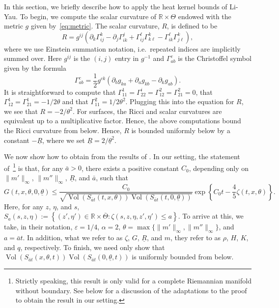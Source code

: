 \documentclass[11pt]{article}    %
\newcommand{\R}{\mathbb{R}}
\renewcommand{\epsilon}{\varepsilon}
\DeclareMathOperator{\Vol}{Vol}
\begin{document}
In this section, we briefly describe how to apply the heat kernel bounds of Li-Yau.  To begin, we compute the scalar curvature of $\R\times \Theta$ endowed with the metric $g$ given by~\eqref{eq:metric}.  The scalar curvature, $R$, is defined to be
\[
	R = g^{ij} \left( \partial_k \Gamma_{ij}^k - \partial_j \Gamma_{ik}^j + \Gamma_{ij}^\ell\Gamma_{k\ell}^k - \Gamma_{ik}^\ell\Gamma_{j\ell}^k\right),
\]
where we use Einstein summation notation, i.e.~repeated indices are implicitly summed over.  Here $g^{ij}$ is the $(i,j)$ entry in $g^{-1}$ and $\Gamma_{ab}^c$ is the Christoffel symbol given by the formula
\[
	\Gamma_{ab}^c = \frac{1}{2} g^{ck} \left( \partial_b g_{ka} + \partial_a g_{kb} - \partial_k g_{ab}\right).
\]
It is straightforward to compute that $\Gamma_{11}^1 = \Gamma_{22}^i = \Gamma_{12}^2 = \Gamma_{21}^2 = 0$, that $\Gamma_{12}^1 = \Gamma_{21}^1 = - 1/2\theta$ and that $\Gamma_{11}^2 = 1/2\theta^2$.  Plugging this into the equation for $R$, we see that $R = -2/\theta^2$.  For surfaces, the Ricci and scalar curvatures are equivalent up to a multiplicative factor.  Hence, the above computations bound the Ricci curvature from below.
Hence, $R$ is bounded uniformly below by a constant $-\underline R$, where we set $\underline R = 2/\underline\theta^2$.

We now show how to obtain  from the results of \cite{LiYau}.  In our setting, the statement of~\cite[Corollary~3.2]{LiYau}\footnote{Strictly speaking, this result is only valid for a complete Riemannian manifold without boundary.  See below for a discussion of the adaptations to the proof to obtain the result in our setting.} %
is that, for any $\bar a >0$, %
there exists a positive constant $C_0$, depending only on $\|m'\|_\infty$, $\|m''\|_\infty$, $\underline R$, and $\bar a$, such that
\begin{equation}\label{eq:prelim_heat_kernel_bound}
	G(t,x,\theta, 0, \underline\theta)
		\leq \frac{C_0}{\sqrt{\Vol(S_{\bar a t}(t,x,\theta)) \Vol(S_{\bar a t}(t,0,\underline\theta))}} \exp \left\{ C_0t - \frac{4}{5} \zeta(t,x,\theta) \right\}.
\end{equation}
Here, for any $z$, $\eta$, and $s$, $S_{a}(s,z,\eta) := \left\{(z',\eta') \in \R\times \overline{\Theta} : \zeta(s,z,\eta,z',\eta') \leq a \right\}$.  To arrive at this, we take, in their notation, $\epsilon = 1/4$, $\alpha = 2$, $\theta = \max\{\|m'\|_\infty, \|m''\|_\infty\}$, and $a = \bar at$. %
 In addition, what we refer to as $\zeta$, $G$, $\underline R$, and $m$, they refer to as $\rho$, $H$, $K$, and $q$, respectively.  To finish, we need only show that $\Vol(S_{\bar a t}(x,\theta,t))\Vol(S_{\bar a t}(0,\underline\theta,t))$ is uniformly bounded from below.
\end{document}

